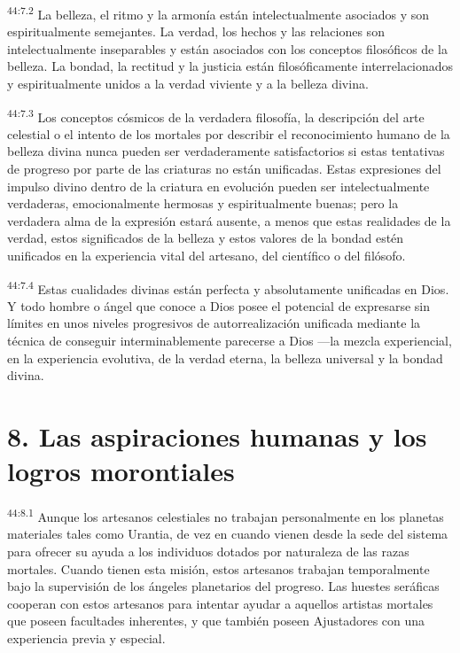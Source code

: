 \par
\textsuperscript{44:7.2} La belleza, el ritmo y la armonía están intelectualmente asociados y son espiritualmente semejantes. La verdad, los hechos y las relaciones son intelectualmente inseparables y están asociados con los conceptos filosóficos de la belleza. La bondad, la rectitud y la justicia están filosóficamente interrelacionados y espiritualmente unidos a la verdad viviente y a la belleza divina.

\par
\textsuperscript{44:7.3} Los conceptos cósmicos de la verdadera filosofía, la descripción del arte celestial o el intento de los mortales por describir el reconocimiento humano de la belleza divina nunca pueden ser verdaderamente satisfactorios si estas tentativas de progreso por parte de las criaturas no están unificadas. Estas expresiones del impulso divino dentro de la criatura en evolución pueden ser intelectualmente verdaderas, emocionalmente hermosas y espiritualmente buenas; pero la verdadera alma de la expresión estará ausente, a menos que estas realidades de la verdad, estos significados de la belleza y estos valores de la bondad estén unificados en la experiencia vital del artesano, del científico o del filósofo.

\par
\textsuperscript{44:7.4} Estas cualidades divinas están perfecta y absolutamente unificadas en Dios. Y todo hombre o ángel que conoce a Dios posee el potencial de expresarse sin límites en unos niveles progresivos de autorrealización unificada mediante la técnica de conseguir interminablemente parecerse a Dios ---la mezcla experiencial, en la experiencia evolutiva, de la verdad eterna, la belleza universal y la bondad divina.

\section*{8. Las aspiraciones humanas y los logros morontiales}
\par
\textsuperscript{44:8.1} Aunque los artesanos celestiales no trabajan personalmente en los planetas materiales tales como Urantia, de vez en cuando vienen desde la sede del sistema para ofrecer su ayuda a los individuos dotados por naturaleza de las razas mortales. Cuando tienen esta misión, estos artesanos trabajan temporalmente bajo la supervisión de los ángeles planetarios del progreso. Las huestes seráficas cooperan con estos artesanos para intentar ayudar a aquellos artistas mortales que poseen facultades inherentes, y que también poseen Ajustadores con una experiencia previa y especial.

